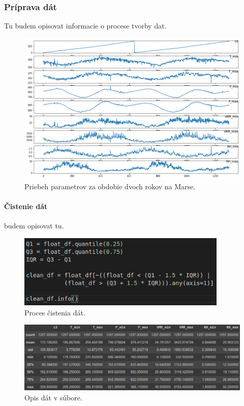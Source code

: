 \subsubsection{Príprava dát}
Tu budem opisovat informacie o procese tvorby dat.
\begin{figure}[!htbp]
  \centering
  \includegraphics[width=16cm]{img/full_df.png}
  \caption{Priebeh parametrov za obdobie dvoch rokov na Marse.}
  \label{fulldf}
\end{figure}

\paragraph{Čistenie dát} budem opisovat tu.

\begin{figure}[!htbp]
  \centering
  \includegraphics[width=10cm]{img/clean_data.png}
  \caption{Proces čistenia dát.}
  \label{cleandf}
\end{figure}

\begin{figure}[!htbp]
  \centering
  \includegraphics[width=16cm]{img/df_desc.png}
  \caption{Opis dát v súbore.}
  \label{dfdesc}
\end{figure}

